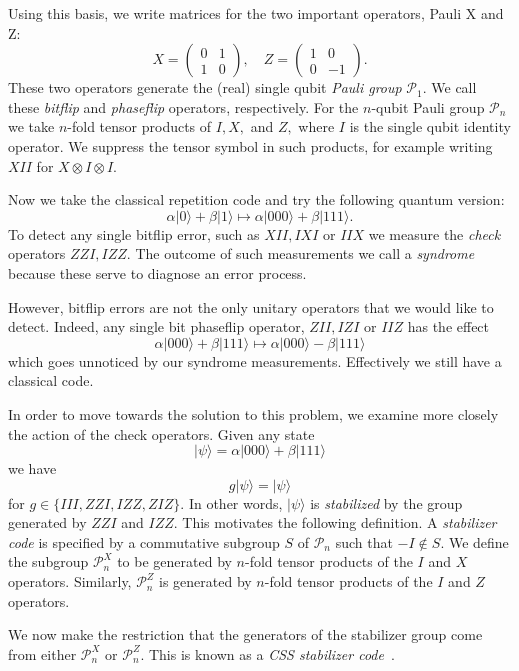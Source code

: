 \documentclass[11pt,oneside]{report}
\def\Pauli{\mathcal{P}}
\newcommand{\ket}[1]{|{#1}\rangle}
\begin{document}
Using this basis, we write matrices for 
the two important operators, Pauli X and Z:
$$
X = \left( \begin{array}{ll}
0&1\\
1&0\end{array} \right),\quad
Z = \left( \begin{array}{rr}
1&0\\
0&-1\end{array} \right).
$$
These two operators generate the (real) single qubit \emph{Pauli group} $\Pauli_1.$
We call these \emph{bitflip} and \emph{phaseflip} operators, respectively.
For the $n$-qubit Pauli group $\Pauli_n$
we take $n$-fold tensor products of $I, X,$ and $Z,$
where $I$ is the single qubit identity operator.
We suppress the tensor symbol in such products, for example
writing $XII$ for $X\otimes I\otimes I.$

Now we take the classical repetition code and
try the following quantum version:
$$
    \alpha\ket{0} + \beta\ket{1} \mapsto \alpha\ket{000} + \beta\ket{111}.
$$
To detect any single bitflip error, such as
$XII, IXI$ or $IIX$ 
we measure the \emph{check} operators
$ ZZI, IZZ.$
The outcome of such measurements we call a \emph{syndrome}
because these serve to diagnose an error process.

However, bitflip errors are not the only unitary operators
that we would like to detect.
Indeed, any single bit phaseflip operator, $ZII, IZI$ or $IIZ$
has the effect
$$
    \alpha\ket{000} + \beta\ket{111} \mapsto \alpha\ket{000} - \beta\ket{111}
$$
which goes unnoticed by our syndrome measurements.
Effectively we still have a classical code.

In order to move towards the solution to this problem,
we examine more closely the action of the check operators.
Given any state 
$$
    \ket{\psi} = \alpha\ket{000} + \beta\ket{111}
$$
we have 
$$
    g \ket{\psi} = \ket{\psi}
$$
for $g \in \{III, ZZI, IZZ, ZIZ\}.$
In other words, $\ket{\psi}$ is \emph{stabilized}
by the group generated by $ZZI$ and $IZZ.$
This motivates the following definition.
A \emph{stabilizer code} is 
specified by a commutative subgroup $S$ of $\Pauli_n$
such that $-I\notin S.$
We define the subgroup $\Pauli_n^X$
to be generated by $n$-fold tensor products of the $I$ and $X$ operators.
Similarly, $\Pauli_n^Z$ 
is generated by $n$-fold tensor products of the $I$ and $Z$ operators.

We now make the restriction that the generators of
the stabilizer group come from either $\Pauli_n^X$ or $\Pauli_n^Z$.
This is known as a \emph{CSS stabilizer code}\ \cite{Gottesman1996,Calderbank1997}.
\end{document}
